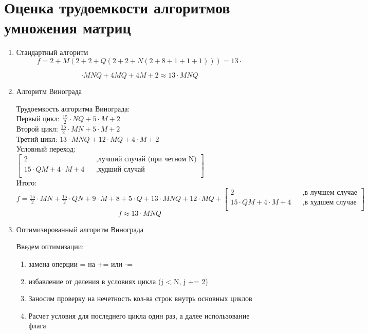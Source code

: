 \documentclass[12pt]{report}
\begin{document}
	\newpage
	
	\section{Оценка трудоемкости алгоритмов умножения матриц}
	\hfill
	\begin{enumerate}
		\item Стандартный алгоритм
		$$f=2+M(2+2+Q(2+2+N(2+8+1+1+1)))=13 \cdot$$
		
		$$\cdot MNQ+4MQ+4M+2 \approx 13 \cdot MNQ$$ 
		
		\item Алгоритм Винограда
		
		Трудоемкость алгоритма Винограда:\\
		
		Первый цикл: $\frac{15}{2} \cdot N  Q + 5 \cdot M + 2$ \\
		
		Второй цикл: $\frac{15}{2} \cdot M  N + 5 \cdot M + 2$\\
		
		Третий цикл: $13 \cdot M  N Q + 12 \cdot M Q + 4 \cdot M + 2$\\
		
		Условный переход: $\begin{bmatrix}
			2    &&, \text{лучший случай (при четном N)}\\
			15 \cdot QM + 4 \cdot M + 4 &&, \text{худший случай}\\
		\end{bmatrix} $ \\
		
		Итого: $f = \frac{15}{2} \cdot M  N + \frac{15}{2} \cdot Q  N + 9 \cdot M + 8 +  5 \cdot Q + 13 \cdot M  N Q + 12 \cdot M Q +
		\begin{bmatrix}
			2    &&, \text{в лучшем случае}\\
			15 \cdot QM + 4 \cdot M + 4 &&, \text{в худшем случае}\\
		\end{bmatrix} $ \\
		
		$$f \approx 13 \cdot MNQ $$
		
		\item Оптимизированный алгоритм Винограда
		
		Введем оптимизации: 
		\begin{enumerate}
			\item замена оперции = на += или -=
			\item избавление от деления в условиях цикла (j < N, j += 2)
			\item Заносим проверку на нечетность кол-ва строк внутрь основных циклов
			\item Расчет условия для последнего цикла один раз, а далее использование флага
		\end{enumerate}
		

\end{enumerate}
\end{document}
